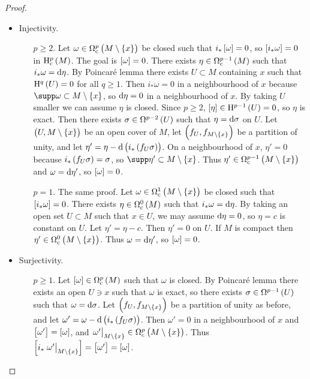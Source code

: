 \begin{proof}
\hfill
\begin{itemize}
\item Injectivity.
\begin{itemize}
\item[$ p \ge 2 $.] Let $ \omega \in \Omega_\c^p\br{M \setminus \cbr{x}} $ be closed such that $ i_*\sbr{\omega} = 0 $, so $ \sbr{i_*\omega} = 0 $ in $ \H_\c^p\br{M} $. The goal is $ \sbr{\omega} = 0 $. There exists $ \eta \in \Omega_\c^{p - 1}\br{M} $ such that $ i_*\omega = \mathrm{d}\eta $. By Poincar\'e lemma there exists $ U \subset M $ containing $ x $ such that $ \H^q\br{U} = 0 $ for all $ q \ge 1 $. Then $ i_*\omega = 0 $ in a neighbourhood of $ x $ because $ \supp \omega \subset M \setminus \cbr{x} $, so $ \mathrm{d}\eta = 0 $ in a neighbourhood of $ x $. By taking $ U $ smaller we can assume $ \eta $ is closed. Since $ p \ge 2 $, $ \sbr{\eta} \in \H^{p - 1}\br{U} = 0 $, so $ \eta $ is exact. Then there exists $ \sigma \in \Omega^{p - 2}\br{U} $ such that $ \eta = \mathrm{d}\sigma $ on $ U $. Let $ \br{U, M \setminus \cbr{x}} $ be an open cover of $ M $, let $ \br{f_U, f_{M \setminus \cbr{x}}} $ be a partition of unity, and let $ \eta' = \eta - \d\br{i_*\br{f_U\sigma}} $. On a neighbourhood of $ x $, $ \eta' = 0 $ because $ i_*\br{f_U\sigma} = \sigma $, so $ \supp \eta' \subset M \setminus \cbr{x} $. Thus $ \eta' \in \Omega_\c^{p - 1}\br{M \setminus \cbr{x}} $ and $ \omega = \mathrm{d}\eta' $, so $ \sbr{\omega} = 0 $.
\item[$ p = 1 $.] The same proof. Let $ \omega \in \Omega_\c^1\br{M \setminus \cbr{x}} $ be closed such that $ \sbr{i_*\omega} = 0 $. There exists $ \eta \in \Omega_\c^0\br{M} $ such that $ i_*\omega = \mathrm{d}\eta $. By taking an open set $ U \subset M $ such that $ x \in U $, we may assume $ \mathrm{d}\eta = 0 $, so $ \eta = c $ is constant on $ U $. Let $ \eta' = \eta - c $. Then $ \eta' = 0 $ on $ U $. If $ M $ is compact then $ \eta' \in \Omega_\c^0\br{M \setminus \cbr{x}} $. Thus $ \omega = \mathrm{d}\eta' $, so $ \sbr{\omega} = 0 $.
\end{itemize}
\item Surjectivity.
\begin{itemize}
\item[$ p \ge 1 $.] Let $ \sbr{\omega} \in \Omega_\c^p\br{M} $ such that $ \omega $ is closed. By Poincar\'e lemma there exists an open $ U \ni x $ such that $ \omega $ is exact, so there exists $ \sigma \in \Omega^{p - 1}\br{U} $ such that $ \omega = \mathrm{d}\sigma $. Let $ \br{f_U, f_{M \setminus \cbr{x}}} $ be a partition of unity as before, and let $ \omega' = \omega - \d\br{i_*\br{f_U\sigma}} $. Then $ \omega' = 0 $ in a neighbourhood of $ x $ and $ \sbr{\omega'} = \sbr{\omega} $, and $ \eval{\omega'}_{M \setminus \cbr{x}} \in \Omega_\c^p\br{M \setminus \cbr{x}} $. Thus $ \sbr{i_*\eval{\omega'}_{M \setminus \cbr{x}}} = \sbr{\omega'} = \sbr{\omega} $.
\end{itemize}
\end{itemize}
\end{proof}

